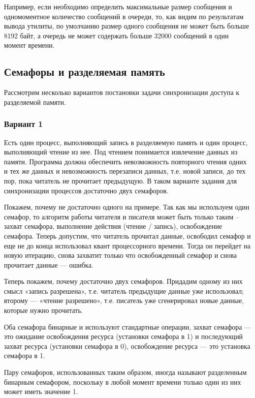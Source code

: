 \documentclass[a4paper]{article}
\begin{document}
	Например, если необходимо определить максимальные размер сообщения и одномоментное количество сообщений в очереди, то, как видим по результатам вывода утилиты, по умолчанию размер одного сообщения не может быть больше 8192 байт, а очередь не может содержать больше 32000 сообщений в один момент времени.
	
\subsection{Семафоры и разделяемая память}
	Рассмотрим несколько вариантов постановки задачи синхронизации доступа к разделяемой памяти.
	
	\subsubsection{Вариант 1}	
	Есть один процесс, выполняющий запись в разделяемую память и один процесс, выполняющий чтение из нее. Под чтением понимается извлечение данных из памяти. Программа должна обеспечить невозможность повторного чтения одних и тех же данных и невозможность перезаписи данных, т.е. новой записи, до тех пор, пока читатель не прочитает предыдущую.
В таком варианте задания для синхронизации процессов достаточно двух семафоров.

	Покажем, почему не достаточно одного на примере. Так как мы используем один семафор, то алгоритм работы читателя и писателя может быть только таким – захват семафора, выполнение действия (чтение / запись), освобождение семафора. Теперь допустим, что читатель прочитал данные, освободил семафор и еще не до конца использовал квант процессорного времени. Тогда он перейдет на новую итерацию, снова захватит только что освобожденный семафор и снова прочитает данные --– ошибка.
	
	Теперь покажем, почему достаточно двух семафоров. Придадим одному из них смысл «запись разрешена», т.е. читатель предыдущие данные уже использовал; второму –-- «чтение разрешено», т.е. писатель уже сгенерировал новые данные, которые нужно прочитать.
	
	Оба семафора бинарные и используют стандартные операции, захват семафора --– это ожидание освобождения ресурса (установки семафора в 1) и последующий захват ресурса (установки семафора в 0), освобождение ресурса --– это установка семафора в 1.

	Пару семафоров, использованных таким образом, иногда называют разделенным бинарным семафором, поскольку в любой момент времени только один из них может иметь значение 1.
	
\end{document}
